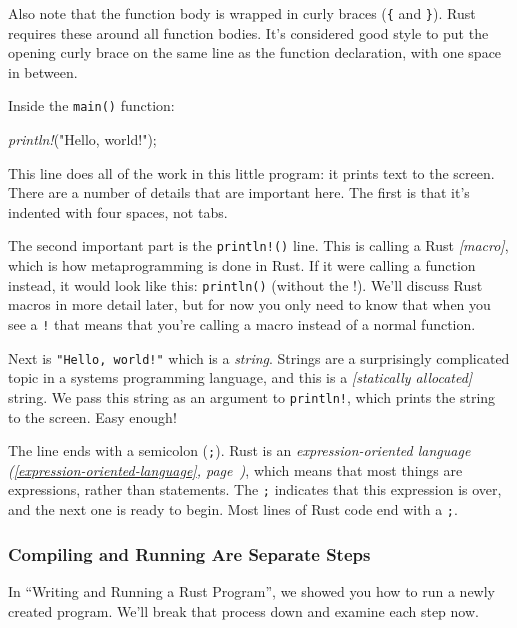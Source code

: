\documentclass[a4paper,]{book}
\renewcommand*{\hyperlink}[2]{%
 #2 (\autoref{#1}, page~\pageref{#1})}
\newenvironment{Shaded}{\begin{snugshade}}{\end{snugshade}}
\newcommand{\StringTok}[1]{\textcolor[rgb]{0.31,0.60,0.02}{{#1}}}
\newcommand{\PreprocessorTok}[1]{\textcolor[rgb]{0.56,0.35,0.01}{\textit{{#1}}}}
\newcommand{\NormalTok}[1]{{#1}}
\begin{document}
Also note that the function body is wrapped in curly braces (\texttt{\{}
and \texttt{\}}). Rust requires these around all function bodies. It's
considered good style to put the opening curly brace on the same line as
the function declaration, with one space in between.

Inside the \texttt{main()} function:

\begin{Shaded}
\begin{Highlighting}[]
    \PreprocessorTok{println!}\NormalTok{(}\StringTok{"Hello, world!"}\NormalTok{);}
\end{Highlighting}
\end{Shaded}

This line does all of the work in this little program: it prints text to
the screen. There are a number of details that are important here. The
first is that it's indented with four spaces, not tabs.

The second important part is the \texttt{println!()} line. This is
calling a Rust \emph{{[}macro{]}}, which is how metaprogramming is done
in Rust. If it were calling a function instead, it would look like this:
\texttt{println()} (without the !). We'll discuss Rust macros in more
detail later, but for now you only need to know that when you see a
\texttt{!} that means that you're calling a macro instead of a normal
function.

Next is \texttt{"Hello,\ world!"} which is a \emph{string}. Strings are
a surprisingly complicated topic in a systems programming language, and
this is a \emph{{[}statically allocated{]}} string. We pass this string
as an argument to \texttt{println!}, which prints the string to the
screen. Easy enough!

The line ends with a semicolon (\texttt{;}). Rust is an
\emph{\protect\hyperlink{expression-oriented-language}{expression-oriented
language}}, which means that most things are expressions, rather than
statements. The \texttt{;} indicates that this expression is over, and
the next one is ready to begin. Most lines of Rust code end with a
\texttt{;}.

\subsubsection{Compiling and Running Are Separate
Steps}\label{compiling-and-running-are-separate-steps}

In ``Writing and Running a Rust Program'', we showed you how to run a
newly created program. We'll break that process down and examine each
step now.
\end{document}

